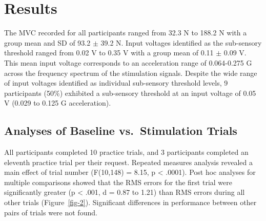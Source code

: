 \documentclass[]{cik}%
\begin{document}
\hypertarget{results}{%
\section{Results}\label{results}}

The MVC recorded for all participants ranged from 32.3 N to 188.2 N with
a group mean and SD of 93.2 \(\pm\) 39.2 N. Input voltages identified as
the sub-sensory threshold ranged from 0.02 V to 0.35 V with a group mean
of 0.11 \(\pm\) 0.09 V. This mean input voltage corresponds to an
acceleration range of 0.064-0.275 G across the frequency spectrum of the
stimulation signals. Despite the wide range of input voltages identified
as individual sub-sensory threshold levels, 9 participants (50\%)
exhibited a sub-sensory threshold at an input voltage of 0.05 V (0.029
to 0.125 G acceleration).

\hypertarget{analyses-of-baseline-vs.-stimulation-trials}{%
\subsection{Analyses of Baseline vs.~Stimulation
Trials}\label{analyses-of-baseline-vs.-stimulation-trials}}

All participants completed 10 practice trials, and 3 participants
completed an eleventh practice trial per their request. Repeated
measures analysis revealed a main effect of trial number (F(10,148) =
8.15, p \textless{} .0001). Post hoc analyses for multiple comparisons
showed that the RMS errors for the first trial were significantly
greater (p \textless{} .001, d = 0.87 to 1.21) than RMS errors during
all other trials (Figure~\ref{fig-2}). Significant differences in
performance between other pairs of trials were not found.
\end{document}
